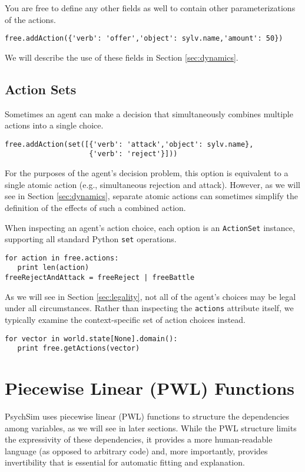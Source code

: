 \documentclass{article}
\begin{document}
You are free to define any other fields as well to contain other parameterizations of the actions. 
\begin{verbatim}
free.addAction({'verb': 'offer','object': sylv.name,'amount': 50})
\end{verbatim}

We will describe the use of these fields in Section \ref{sec:dynamics}.

\subsection{Action Sets}

Sometimes an agent can make a decision that simultaneously combines multiple actions into a single choice.

\begin{verbatim}
free.addAction(set([{'verb': 'attack','object': sylv.name},
                    {'verb': 'reject'}]))
\end{verbatim}

For the purposes of the agent's decision problem, this option is equivalent to a single atomic action (e.g., simultaneous rejection and attack). However, as we will see in Section \ref{sec:dynamics}, separate atomic actions can sometimes simplify the definition of the effects of such a combined action.

When inspecting an agent's action choice, each option is an {\tt ActionSet} instance, supporting all standard Python {\tt set} operations.

\begin{verbatim}
for action in free.actions:
   print len(action)
freeRejectAndAttack = freeReject | freeBattle
\end{verbatim}

As we will see in Section \ref{sec:legality}, not all of the agent's choices may be legal under all circumstances. Rather than inspecting the {\tt actions} attribute itself, we typically examine the context-specific set of action choices instead.

\begin{verbatim}
for vector in world.state[None].domain():
   print free.getActions(vector)
\end{verbatim}

\section{Piecewise Linear (PWL) Functions}

PsychSim uses piecewise linear (PWL) functions to structure the dependencies among variables, as we will see in later sections. While the PWL structure limits the expressivity of these dependencies, it provides a more human-readable language (as opposed to arbitrary code) and, more importantly, provides invertibility that is essential for automatic fitting and explanation.
\end{document}
